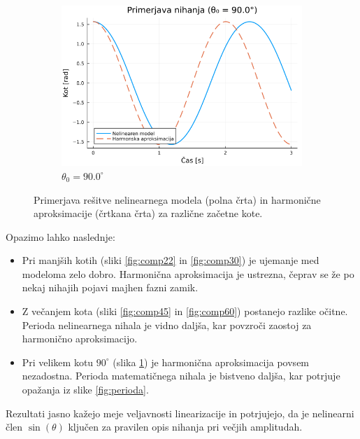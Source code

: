 \documentclass{article}
\begin{document}
\begin{figure}[h!]
    \begin{subfigure}[b]{0.49\textwidth}
        \includegraphics[width=\textwidth]{../slike/primerjava_1.57.png}
        \caption{$\theta_0 = 90.0^\circ$}
        \label{fig:comp90}
    \end{subfigure}
    
    \caption{Primerjava rešitve nelinearnega modela (polna črta) in harmonične aproksimacije (črtkana črta) 
    za različne začetne kote.}
    \label{fig:primerjave}
\end{figure}

Opazimo lahko naslednje:
\begin{itemize}
    \item Pri manjših kotih (sliki \ref{fig:comp22} in \ref{fig:comp30}) je ujemanje med modeloma zelo dobro. 
    Harmonična aproksimacija je ustrezna, čeprav se že po nekaj nihajih pojavi majhen fazni zamik.
    \item Z večanjem kota (sliki \ref{fig:comp45} in \ref{fig:comp60}) postanejo razlike očitne. Perioda 
    nelinearnega nihala je vidno daljša, kar povzroči zaostoj za harmonično aproksimacijo.
    \item Pri velikem kotu $90^\circ$ (slika \ref{fig:comp90}) je harmonična aproksimacija povsem nezadostna. 
    Perioda matematičnega nihala je bistveno daljša, kar potrjuje opažanja iz slike \ref{fig:perioda}.
\end{itemize}
Rezultati jasno kažejo meje veljavnosti linearizacije in potrjujejo, da je nelinearni člen $\sin(\theta)$ 
ključen za pravilen opis nihanja pri večjih amplitudah.
\end{document}
